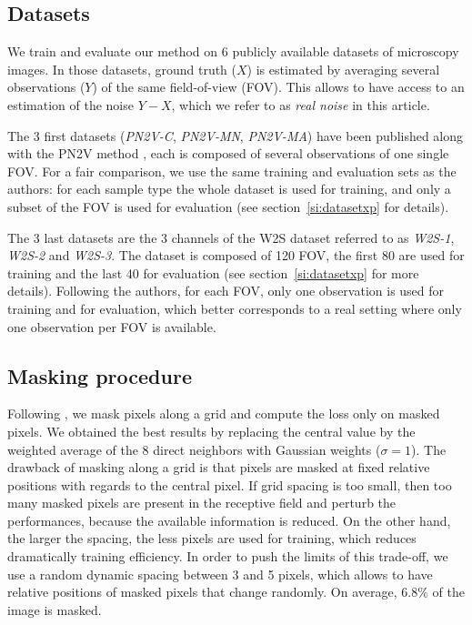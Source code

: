 \documentclass{article}
\begin{document}
\subsection{Datasets}
\label{sec:datasets}
We train and evaluate our method on 6 publicly available datasets of microscopy images. In those datasets, ground truth ($X$) is estimated by averaging several observations ($Y$) of the same field-of-view (FOV).
This allows to have access to an estimation of the noise $Y-X$, which we refer to as \textit{real noise} in this article.

The 3 first datasets (\emph{PN2V-C}, \emph{PN2V-MN}, \emph{PN2V-MA}) have been published along with the PN2V method \cite{krull2019probabilistic}, each is composed of several observations of one single FOV.
For a fair comparison, we use the same training and evaluation sets as the authors: for each sample type the whole dataset is used for training, and only a subset of the FOV is used for evaluation (see section~\ref{si:datasetxp} for details).

The 3 last datasets are the 3 channels of the W2S dataset \cite{zhou2020w2s} referred to as \emph{W2S-1}, \emph{W2S-2} and \emph{W2S-3}.
The dataset is composed of 120 FOV, the first 80 are used for training and the last 40 for evaluation (see section~\ref{si:datasetxp} for more details).
Following the authors, for each FOV, only one observation is used for training and for evaluation, which better corresponds to a real setting where only one observation per FOV is available.

\subsection{Masking procedure}
\label{sec:masking}
Following \cite{batson2019noise2self}, we mask pixels along a grid and compute the loss only on masked pixels.
We obtained the best results by replacing the central value by the weighted average of the 8 direct neighbors with Gaussian weights ($\sigma=1$).
The drawback of masking along a grid is that pixels are masked at fixed relative positions with regards to the central pixel.
If grid spacing is too small, then too many masked pixels are present in the receptive field and perturb the performances, because the available information is reduced.
On the other hand, the larger the spacing, the less pixels are used for training, which reduces dramatically training efficiency.
In order to push the limits of this trade-off, we use a random dynamic spacing between 3 and 5 pixels, which allows to have relative positions of masked pixels that change randomly.
On average, $6.8\%$ of the image is masked.
\end{document}
